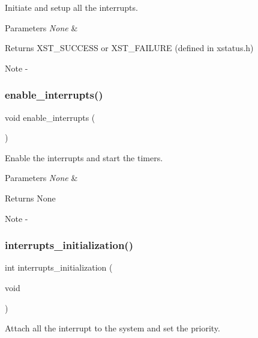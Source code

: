 Initiate and setup all the interrupts. 


\begin{DoxyParams}{Parameters}
{\em None} & \\
\hline
\end{DoxyParams}
\begin{DoxyReturn}{Returns}
X\+S\+T\+\_\+\+S\+U\+C\+C\+E\+SS or X\+S\+T\+\_\+\+F\+A\+I\+L\+U\+RE (defined in xstatus.\+h)
\end{DoxyReturn}
\begin{DoxyNote}{Note}
-\/ 
\end{DoxyNote}
\mbox{\label{interrupt_8c_a154b837080a092ecbab0735a0254c4b4}} 
\subsubsection{enable\_interrupts()}
{\footnotesize\ttfamily void enable\+\_\+interrupts (\begin{DoxyParamCaption}{ }\end{DoxyParamCaption})}



Enable the interrupts and start the timers. 


\begin{DoxyParams}{Parameters}
{\em None} & \\
\hline
\end{DoxyParams}
\begin{DoxyReturn}{Returns}
None
\end{DoxyReturn}
\begin{DoxyNote}{Note}
-\/ 
\end{DoxyNote}
\mbox{\label{interrupt_8c_acbe15f5aca74bbc4c10c75772b6f83d2}} 
\subsubsection{interrupts\_initialization()}
{\footnotesize\ttfamily int interrupts\+\_\+initialization (\begin{DoxyParamCaption}\item[{void}]{ }\end{DoxyParamCaption})}



Attach all the interrupt to the system and set the priority. 


